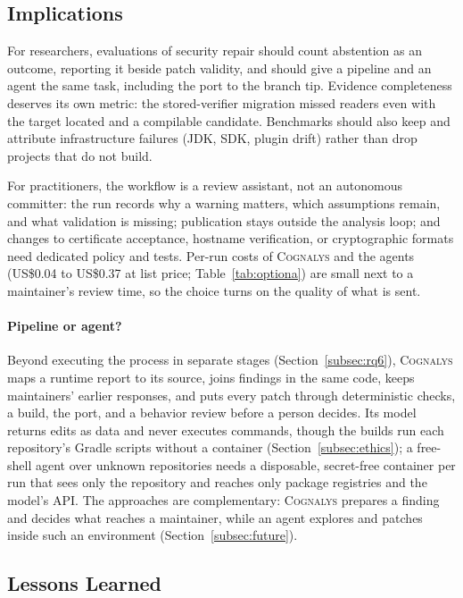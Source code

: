 \documentclass[conference]{IEEEtran}
\newcommand{\system}{\textsc{Cognalys}}
\begin{document}
\subsection{Implications}

For researchers, evaluations of security repair should count abstention as an
outcome, reporting it beside patch validity, and should give a pipeline and an
agent the same task, including the port to the branch tip. Evidence
completeness deserves its own metric: the stored-verifier migration missed
readers even with the target located and a compilable candidate. Benchmarks
should also keep and attribute infrastructure failures (JDK, SDK, plugin drift)
rather than drop projects that do not build.

For practitioners, the workflow is a review assistant, not an autonomous
committer: the run records why a warning matters, which assumptions remain,
and what validation is missing; publication stays outside the analysis loop;
and changes to certificate acceptance, hostname verification, or cryptographic
formats need dedicated policy and tests. Per-run costs of \system{} and the
agents (US\$0.04 to US\$0.37 at list price; Table~\ref{tab:optiona}) are small
next to a maintainer's review time, so the choice turns on the quality of what
is sent.

\paragraph{Pipeline or agent?} Beyond executing the process in separate stages
(Section~\ref{subsec:rq6}), \system{} maps a runtime report to its source,
joins findings in the same code, keeps maintainers' earlier responses, and puts
every patch through deterministic checks, a build, the port, and a behavior
review before a person decides. Its model returns edits as data and never
executes commands, though the builds run each repository's Gradle scripts
without a container (Section~\ref{subsec:ethics}); a free-shell agent over
unknown repositories needs a disposable, secret-free container per run that
sees only the repository and reaches only package registries and the model's API. The approaches are complementary: \system{} prepares a
finding and decides what reaches a maintainer, while an agent explores and
patches inside such an environment (Section~\ref{subsec:future}).

\subsection{Lessons Learned}
\label{sec:lessons}
\end{document}
